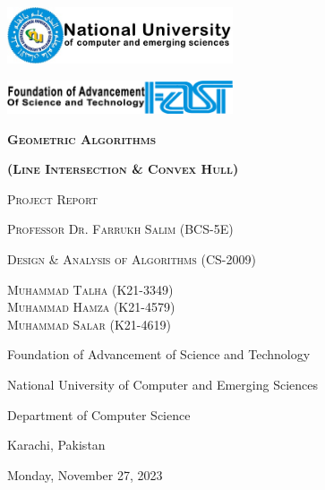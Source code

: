 \documentclass[a4paper, 10pt, twocolumn]{article}
\begin{document}
\begin{titlepage}
    \centering
    \vspace{3.5cm}
    \includegraphics[width=0.5\textwidth]{NU-logo.jpg}\par\vspace{1cm}
    \includegraphics[width=0.5\textwidth]{FAST.png}\par\vspace{1cm}
    \vspace{1cm}
    {\scshape\Huge\textbf {Geometric Algorithms} \par}
    {\scshape\Huge\textbf {(Line Intersection \& Convex Hull)} \par}
    \vspace{1cm}
    {\scshape\Large Project Report \par}
    \vspace{1cm}
    {\scshape\Large Professor Dr. Farrukh Salim (BCS-5E) \par}
    \vspace{1cm}
    {\scshape\Large Design \& Analysis of Algorithms (CS-2009) \par}
    \vspace{1cm}
    {\scshape\Large Muhammad Talha (K21-3349) \\ Muhammad Hamza (K21-4579) \\ Muhammad Salar (K21-4619) \par}
    \vfill
    \vspace{1cm}    
    {Foundation of Advancement of Science and Technology \par}
    {National University of Computer and Emerging Sciences \par}
    {Department of Computer Science \par}
    {Karachi, Pakistan \par}
    {Monday, November 27, 2023 \par}
\end{titlepage}
\end{document}
